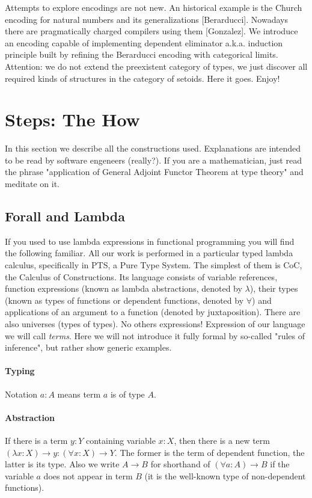 \documentclass[11pt,oneside]{article}
\begin{document}
Attempts to explore encodings are not new. An historical example is the
Church encoding for natural numbers and its generalizations [Berarducci].
Nowadays there are pragmatically charged compilers using them [Gonzalez].
We introduce an encoding capable of implementing dependent eliminator a.k.a.
induction principle built by refining the Berarducci encoding with categorical limits.
Attention: we do not extend the preexistent category of types,
we just discover all required kinds of structures in the category of setoids.
Here it goes. Enjoy!

\newpage
\section{Steps: The How}

In this section we describe all the constructions used.
Explanations are intended to be read by software engeneers (really?).
If you are a mathematician, just read the phrase
"application of General Adjoint Functor Theorem at type theory" and meditate on it.

\subsection{Forall and Lambda}

If you used to use lambda expressions in functional programming
you will find the following familiar.
All our work is performed in a particular typed lambda calculus,
specifically in PTS, a Pure Type System.
The simplest of them is CoC, the Calculus of Constructions.
Its language consists of variable references,
function expressions (known as lambda abstractions,
denoted by $\lambda$),
their types (known as types of functions or dependent functions,
denoted by $\forall$)
and applications of an argument to a function
(denoted by juxtaposition).
There are also universes (types of types).
No others expressions!
Expression of our language we will call {\em terms}.
Here we will not introduce it fully formal by so-called
"rules of inference", but rather show generic examples.

\paragraph{Typing}
Notation $a : A$ means term $a$ is of type $A$.

\paragraph{Abstraction}
If there is a term $y : Y$ containing variable $x : X$,
then there is a new term
$(\lambda x : X) \rightarrow y : (\forall x : X) \rightarrow Y$.
The former is the term of dependent function, the latter is its type.
Also we write $A \rightarrow B$ for shorthand of
$(\forall a : A) \rightarrow B$ if the variable $a$
does not appear in term $B$
(it is the well-known type of non-dependent functions).
\end{document}
